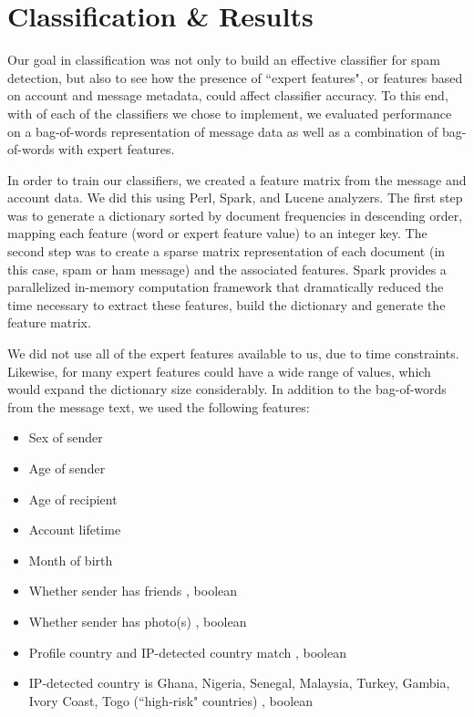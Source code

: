 \documentclass[preprint]{acm_proc_article-sp}
\begin{document}
\section{Classification \& Results}

Our goal in classification was not only to build an effective classifier for spam detection, but also to see how the presence of ``expert features", or features based on account and message metadata, could affect classifier accuracy. To this end, with of each of the classifiers we chose to implement, we evaluated performance on a bag-of-words representation of message data as well as a combination of bag-of-words with expert features.

In order to train our classifiers, we created a feature matrix from the message and account data. We did this using 
Perl, Spark, and Lucene analyzers. The first step was to generate a dictionary sorted by document frequencies in descending 
order, mapping each feature (word or expert feature value) to an integer key. The second step was to create a sparse 
matrix representation of each document (in this case, spam or ham message) and the associated features. Spark provides a 
parallelized in-memory computation framework that dramatically reduced the time necessary to extract these features, 
build the dictionary and generate the feature matrix. 

We did not use all of the expert features available to us, due to time constraints. Likewise, for many expert features could 
have a wide range of values, which would expand the dictionary size considerably. In addition to the bag-of-words from the 
message text, we used the following features:
\begin{itemize}
\item Sex of sender
\item Age of sender
\item Age of recipient
\item Account lifetime
\item Month of birth 
\item Whether sender has friends , boolean
\item Whether sender has photo(s) , boolean
\item Profile country and IP-detected country match , boolean
\item IP-detected country is Ghana, Nigeria, Senegal, Malaysia, Turkey, Gambia, Ivory Coast, Togo (``high-risk" countries) , boolean
\end{itemize}
\end{document}
